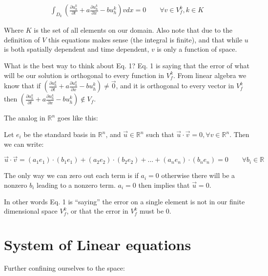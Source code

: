 \documentclass{article}
\begin{document}
\begin{gather}
  \int_{D_k} \left(\frac{\partial u_h^k}{\partial t} + a \frac{\partial u_h^k}{\partial x} - bu^k_h\right) v dx = 0 \qquad \forall v \in V_f^k,  k \in K
\end{gather}

\noindent Where $K$ is the set of all elements on our domain. Also note that due to the definition of $V$ this equations makes sense (the integral is finite), and that while $u$ is both spatially dependent and time dependent, $v$ is only a function of space.

\vspace{3mm}

\noindent What is the best way to think about Eq. 1? Eq. 1 is saying that the error of what will be our solution is orthogonal to every function in $V_f^k$. From linear algebra we know that if $\left(\frac{\partial u_h^k}{\partial t} + a \frac{\partial u_h^k}{\partial x} - bu_h^k\right) \neq \vec{0}$, and it is orthogonal to every vector in $V_f^k$ then $\left(\frac{\partial u_h^k}{\partial t} + a \frac{\partial u_h^k}{\partial x} - bu_h^k\right) \notin V_f$.

\vspace{3mm}

\noindent The analog in $\mathbb{R}^n$ goes like this:

\noindent Let $e_i$ be the standard basis in $\mathbb{R}^n$, and
$\vec{u} \in \mathbb{R}^n$ such that $\vec{u} \cdot \vec{v} = 0, \forall v \in \mathbb{R}^n$. Then we can write:

$$\vec{u} \cdot \vec{v} = (a_1e_1)\cdot(b_1e_1) + (a_2e_2)\cdot(b_2e_2) + ... + (a_ne_n)\cdot(b_ne_n) = 0 \qquad \forall b_i \in \mathbb{R}$$

The only way we can zero out each term is if $a_i = 0$ otherwise there will be a nonzero $b_i$ leading to a nonzero term. $a_i = 0$ then implies that $\vec{u} = 0$.

\vspace{3mm}

\noindent In other words Eq. 1 is ``saying'' the error on a single element is not in our finite dimensional space $V_f^k$, or that the error in $V_f^k$ must be 0.

\section{System of Linear equations}

\noindent Further confining ourselves to the space:
\end{document}
